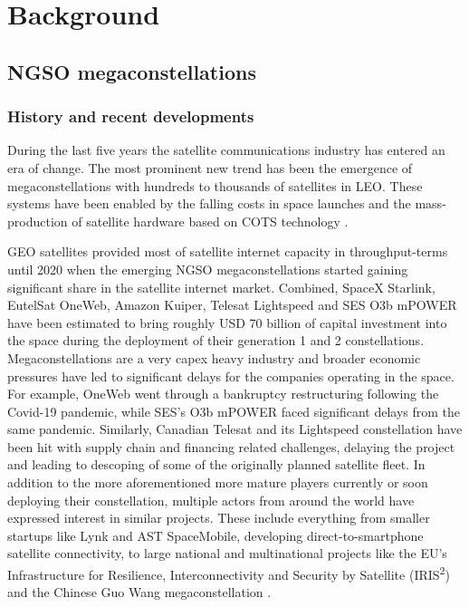 \documentclass[english, 12pt, a4paper, elec, utf8, a-1b, online]{aaltothesis}
\begin{document}
\clearpage

\section{Background}

\subsection{NGSO megaconstellations}
\subsubsection{History and recent developments}
During the last five years the satellite communications industry has entered an era of change.
The most prominent new trend has been the emergence of megaconstellations with hundreds to thousands of satellites in LEO.
These systems have been enabled by the falling costs in space launches and the mass-production of satellite hardware based on COTS technology \cite{portillo2019technical,euspa-secure-satcom-2023,euroconsult-ngso-tracker-2023-q3}.

GEO satellites provided most of satellite internet capacity in throughput-terms until 2020 when the emerging NGSO megaconstellations started gaining significant share in the satellite internet market.
Combined, SpaceX Starlink, EutelSat OneWeb, Amazon Kuiper, Telesat Lightspeed and SES O3b mPOWER have been estimated to bring roughly USD 70 billion of capital investment into the space during the deployment of their generation 1 and 2 constellations.
Megaconstellations are a very capex heavy industry and broader economic pressures have led to significant delays for the companies operating in the space.
For example, OneWeb went through a bankruptcy restructuring following the Covid-19 pandemic, while SES's O3b mPOWER faced significant delays from the same pandemic.
Similarly, Canadian Telesat and its Lightspeed constellation have been hit with supply chain and financing related challenges, delaying the project and leading to descoping of some of the originally planned satellite fleet.
In addition to the more aforementioned more mature players currently or soon deploying their constellation, multiple actors from around the world have expressed interest in similar projects.
These include everything from smaller startups like Lynk and AST SpaceMobile, developing direct-to-smartphone satellite connectivity, to large national and multinational projects like the EU's Infrastructure for Resilience, Interconnectivity and Security by Satellite (IRIS\textsuperscript{2}) and the Chinese Guo Wang megaconstellation \cite{euspa-secure-satcom-2023,euroconsult-ngso-tracker-2023-q3}.
\end{document}
